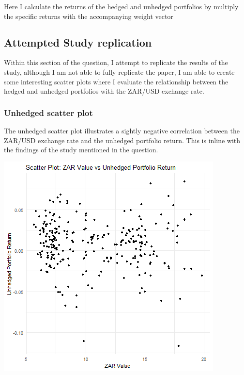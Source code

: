\documentclass[11pt,preprint, authoryear]{elsarticle}
\let\origfigure\figure
\let\endorigfigure\endfigure
\renewenvironment{figure}[1][2] {
    \expandafter\origfigure\expandafter[H]
} {
    \endorigfigure
}
\numberwithin{equation}{section}
\numberwithin{figure}{section}
\numberwithin{table}{section}
\begin{document}
Here I calculate the returns of the hedged and unhedged portfolios by
multiply the specific returns with the accompanying weight vector

\hypertarget{attempted-study-replication}{%
\subsection{Attempted Study
replication}\label{attempted-study-replication}}

Within this section of the question, I attempt to replicate the results
of the study, although I am not able to fully replicate the paper, I am
able to create some interesting scatter plots where I evaluate the
relationship between the hedged and unhedged portfolios with the ZAR/USD
exchange rate.

\hypertarget{unhedged-scatter-plot}{%
\subsubsection{Unhedged scatter plot}\label{unhedged-scatter-plot}}

The unhedged scatter plot illustrates a sightly negative correlation
between the ZAR/USD exchange rate and the unhedged portfolio return.
This is inline with the findings of the study mentioned in the question.

\begin{figure}[H]

{\centering \includegraphics{Question-2_files/figure-latex/Figure 1-1} 

}

\caption{Unhedged vs ZAR/USD scatter plot \label{Figure1}}\label{fig:Figure 1}
\end{figure}
\end{document}
